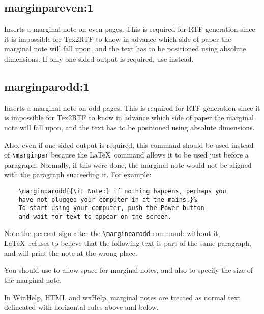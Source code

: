 \subsection*{marginpareven:1}\label{marginpareven}

Inserts a marginal note on even pages. This is required for RTF generation since
it is impossible for Tex2RTF to know in advance which side of paper the marginal note
will fall upon, and the text has to be positioned using absolute dimensions.
If only one sided output is required, use  \rtfsp
instead.

\subsection*{marginparodd:1}\label{marginparodd}

Inserts a marginal note on odd pages. This is required for RTF generation since
it is impossible for Tex2RTF to know in advance which side of paper the marginal note
will fall upon, and the text has to be positioned using absolute dimensions.

Also, even if one-sided output is required, this command should be used instead
of \verb$\marginpar$ because the \LaTeX\ command allows it to be used
just before a paragraph. Normally, if this were done, the marginal note would
not be aligned with the paragraph succeeding it. For example:

\begin{verbatim}
    \marginparodd{{\it Note:} if nothing happens, perhaps you
    have not plugged your computer in at the mains.}%
    To start using your computer, push the Power button
    and wait for text to appear on the screen.
\end{verbatim}

Note the percent sign after the \verb$\marginparodd$ command: without it,
\LaTeX\ refuses to believe that the following text is part of the
same paragraph, and will print the note at the wrong place.

You should use  to allow space for marginal
notes, and also  to specify the size of
the marginal note.

In WinHelp, HTML and wxHelp, marginal notes are treated as normal text delineated
with horizontal rules above and below.


